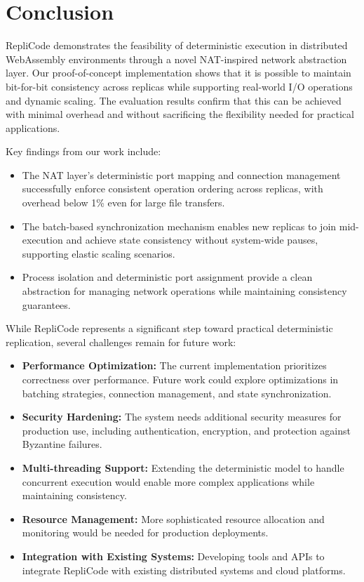 \documentclass[10pt]{IEEEtran}
\begin{document}
\section{Conclusion}
RepliCode demonstrates the feasibility of deterministic execution in distributed WebAssembly environments through a novel NAT-inspired network abstraction layer. Our proof-of-concept implementation shows that it is possible to maintain bit-for-bit consistency across replicas while supporting real-world I/O operations and dynamic scaling. The evaluation results confirm that this can be achieved with minimal overhead and without sacrificing the flexibility needed for practical applications.

Key findings from our work include:
\begin{itemize}
    \item The NAT layer's deterministic port mapping and connection management successfully enforce consistent operation ordering across replicas, with overhead below 1\% even for large file transfers.
    \item The batch-based synchronization mechanism enables new replicas to join mid-execution and achieve state consistency without system-wide pauses, supporting elastic scaling scenarios.
    \item Process isolation and deterministic port assignment provide a clean abstraction for managing network operations while maintaining consistency guarantees.
\end{itemize}

While RepliCode represents a significant step toward practical deterministic replication, several challenges remain for future work:
\begin{itemize}
    \item \textbf{Performance Optimization:} The current implementation prioritizes correctness over performance. Future work could explore optimizations in batching strategies, connection management, and state synchronization.
    \item \textbf{Security Hardening:} The system needs additional security measures for production use, including authentication, encryption, and protection against Byzantine failures.
    \item \textbf{Multi-threading Support:} Extending the deterministic model to handle concurrent execution would enable more complex applications while maintaining consistency.
    \item \textbf{Resource Management:} More sophisticated resource allocation and monitoring would be needed for production deployments.
    \item \textbf{Integration with Existing Systems:} Developing tools and APIs to integrate RepliCode with existing distributed systems and cloud platforms.
\end{itemize}
\end{document}
